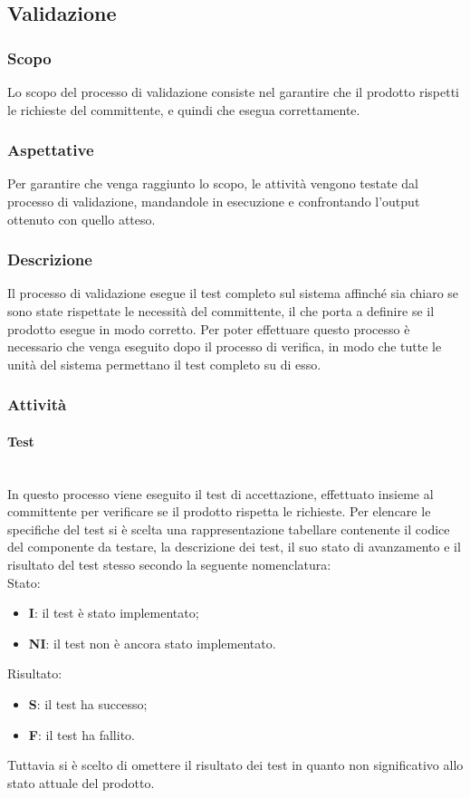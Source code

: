 \subsection{Validazione}

	\subsubsection{Scopo}
		Lo scopo del processo di validazione consiste nel garantire che il prodotto rispetti le richieste del committente, e quindi che esegua correttamente.
	\subsubsection{Aspettative}
		Per garantire che venga raggiunto lo scopo, le attività vengono testate dal processo di validazione, mandandole in esecuzione e confrontando l'output ottenuto con quello atteso.
	\subsubsection{Descrizione}
		Il processo di validazione esegue il test completo sul sistema affinché sia chiaro se sono state rispettate le necessità del committente, il che porta a definire se il prodotto esegue in modo corretto. Per poter effettuare questo processo è necessario che venga eseguito dopo il processo di verifica, in modo che tutte le unità del sistema permettano il test completo su di esso. 
	\subsubsection{Attività}
		\paragraph{Test}\mbox{}\\
			In questo processo viene eseguito il test di accettazione, effettuato insieme al committente per verificare se il prodotto rispetta le richieste.
			Per elencare le specifiche del test si è scelta una rappresentazione tabellare contenente il codice del componente da testare, la descrizione dei test, il suo stato di avanzamento e il risultato del test stesso secondo la seguente nomenclatura: \\
                Stato:
                \begin{itemize}
                    \item \textbf{I}: il test è stato implementato;
                    \item \textbf{NI}: il test non è ancora stato implementato.     
                \end{itemize}
                Risultato:
                \begin{itemize}
                    \item \textbf{S}: il test ha successo;
                    \item \textbf{F}: il test ha fallito.
                \end{itemize}
                Tuttavia si è scelto di omettere il risultato dei test in quanto non significativo allo stato attuale del prodotto.

